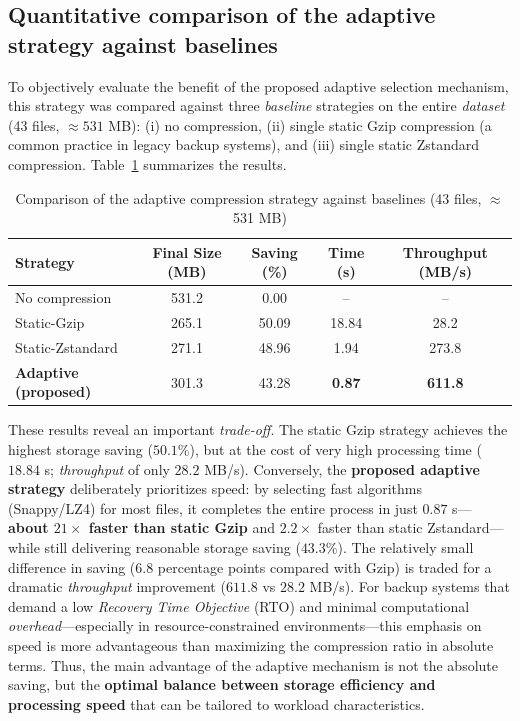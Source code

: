 \documentclass{iaesarticle}
\begin{document}
\subsection{Quantitative comparison of the adaptive strategy against baselines}
To objectively evaluate the benefit of the proposed adaptive selection mechanism, this strategy was compared against three \textit{baseline} strategies on the entire \textit{dataset} (43 files, $\approx 531$ MB): (i) no compression, (ii) single static Gzip compression (a common practice in legacy backup systems), and (iii) single static Zstandard compression. Table~\ref{tab:baseline_comparison} summarizes the results.

\begin{table}[H]
\centering
\fontsize{8pt}{10pt}\selectfont
\caption{Comparison of the adaptive compression strategy against baselines (43 files, $\approx$531 MB)}
\label{tab:baseline_comparison}
\begin{tabular}{l c c c c}
\hline
\textbf{Strategy} & \textbf{Final Size (MB)} & \textbf{Saving (\%)} & \textbf{Time (s)} & \textbf{Throughput (MB/s)} \\
\hline
No compression        & 531.2 & 0.00  & --    & -- \\
Static-Gzip           & 265.1 & 50.09 & 18.84 & 28.2 \\
Static-Zstandard      & 271.1 & 48.96 & 1.94  & 273.8 \\
\textbf{Adaptive (proposed)} & 301.3 & 43.28 & \textbf{0.87} & \textbf{611.8} \\
\hline
\end{tabular}
\end{table}

These results reveal an important \textit{trade-off}. The static Gzip strategy achieves the highest storage saving ($50.1\%$), but at the cost of very high processing time ($18.84$ s; \textit{throughput} of only $28.2$ MB/s). Conversely, the \textbf{proposed adaptive strategy} deliberately prioritizes speed: by selecting fast algorithms (Snappy/LZ4) for most files, it completes the entire process in just $0.87$ s---\textbf{about $21\times$ faster than static Gzip} and $2.2\times$ faster than static Zstandard---while still delivering reasonable storage saving ($43.3\%$). The relatively small difference in saving ($6.8$ percentage points compared with Gzip) is traded for a dramatic \textit{throughput} improvement ($611.8$ vs $28.2$ MB/s). For backup systems that demand a low \textit{Recovery Time Objective} (RTO) and minimal computational \textit{overhead}---especially in resource-constrained environments---this emphasis on speed is more advantageous than maximizing the compression ratio in absolute terms. Thus, the main advantage of the adaptive mechanism is not the absolute saving, but the \textbf{optimal balance between storage efficiency and processing speed} that can be tailored to workload characteristics.
\end{document}
